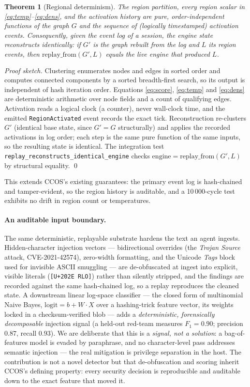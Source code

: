 \documentclass[11pt]{article}
\newtheorem{theorem}{Theorem}
\newcommand{\code}[1]{\texttt{#1}}
\begin{document}
\begin{theorem}[Regional determinism]
The region partition, every region scalar in
\eqref{eq:temp}--\eqref{eq:dens}, and the activation history are pure,
order-independent functions of the graph $G$ and the sequence of (logically
timestamped) activation events. Consequently, given the event log of a session,
the engine state reconstructs identically: if $G'$ is the graph rebuilt from the
log and $L$ its region events, then $\mathrm{replay\_from}(G',L)$ equals the live
engine that produced $L$.
\end{theorem}
\begin{proof}[Proof sketch]
Clustering enumerates nodes and edges in sorted order and computes connected
components by a sorted breadth-first search, so its output is independent of hash
iteration order. Equations \eqref{eq:score}, \eqref{eq:temp} and \eqref{eq:dens}
are deterministic arithmetic over node fields and a count of qualifying edges.
Activation reads a logical clock (a counter), never wall-clock time, and the
emitted \code{RegionActivated} event records the exact tick. Reconstruction
re-clusters $G'$ (identical base state, since $G'\!=\!G$ structurally) and applies
the recorded activations in log order; each step is the same pure function of the
same inputs, so the resulting state is identical. The integration test
\code{replay\_reconstructs\_identical\_engine} checks
$\mathrm{engine}=\mathrm{replay\_from}(G',L)$ by structural equality. \qed
\end{proof}

This extends CCOS's existing guarantees: the primary event log is hash-chained and
tamper-evident, so the region history is auditable, and a 10\,000-cycle test
exhibits no drift in region count or temperatures.

\paragraph{An auditable input boundary.} The same deterministic, replayable
substrate hardens the text an agent ingests. Hidden-character injection vectors
--- bidirectional overrides (the \emph{Trojan Source} attack, CVE-2021-42574),
zero-width formatting, and the Unicode \emph{Tags} block used for invisible ASCII
smuggling --- are de-obfuscated at ingest into explicit, visible literals
(\code{[U+202E RLO]}) rather than silently stripped, and the findings are
recorded against the same hash-chained log, so a replay reproduces the cleaned
state. A downstream linear log-space classifier --- the closed form of
multinomial Naive Bayes, $\mathrm{logit}=b+W\!\cdot\!X$ over a hashing-trick
feature vector, its weights locked in a checksum-verified blob --- adds a
\emph{deterministic, forensically decomposable} injection signal (a held-out
red-team measures $F_1=0.90$; precision $0.87$, recall $0.93$). We are deliberate
that this is a \emph{signal, not a solution}: a bag-of-features model is evaded by
paraphrase, and no character-level pass addresses semantic injection --- the real
mitigation is privilege separation in the host. The contribution is not a novel
detector but that de-obfuscation and scoring inherit CCOS's defining property:
every security decision is reproducible and auditable down to the exact feature
that moved it.
\end{document}
